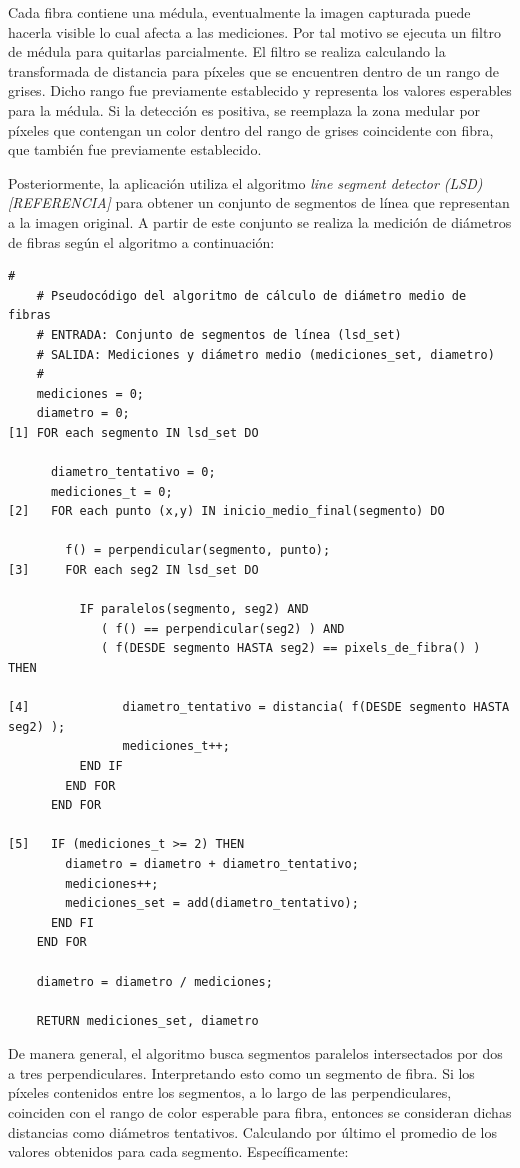 \documentclass[runningheads,a4paper]{llncs}
\begin{document}
Cada fibra contiene una médula, eventualmente la imagen capturada puede hacerla visible lo cual afecta a 
las mediciones. Por tal motivo se ejecuta un filtro de médula para quitarlas parcialmente. El filtro se realiza calculando la transformada de distancia para píxeles que se encuentren dentro de un rango de grises. 
Dicho rango fue previamente establecido y representa los valores esperables para la médula. Si la detección es positiva, se reemplaza la zona medular por píxeles que contengan un color dentro del rango de grises  
coincidente con fibra, que también fue previamente establecido.

Posteriormente, la aplicación utiliza el algoritmo {\it line segment detector (LSD) [REFERENCIA]} para obtener un conjunto de segmentos de línea que representan a la imagen original. A partir de este conjunto se 
realiza la medición de diámetros de fibras según el algoritmo a continuación:

\begin{Verbatim}[commandchars=\\\{\}]
    #
    # Pseudocódigo del algoritmo de cálculo de diámetro medio de fibras
    # ENTRADA: Conjunto de segmentos de línea (lsd_set)
    # SALIDA: Mediciones y diámetro medio (mediciones_set, diametro)
    #
    mediciones = 0;
    diametro = 0;
[1] FOR each segmento IN lsd_set DO

      diametro_tentativo = 0;
      mediciones_t = 0;
[2]   FOR each punto (x,y) IN inicio_medio_final(segmento) DO

        f() = perpendicular(segmento, punto);
[3]     FOR each seg2 IN lsd_set DO

          IF paralelos(segmento, seg2) AND 
             ( f() == perpendicular(seg2) ) AND
             ( f(DESDE segmento HASTA seg2) == pixels_de_fibra() ) THEN

[4]             diametro_tentativo = distancia( f(DESDE segmento HASTA seg2) );
                mediciones_t++;
          END IF
        END FOR
      END FOR

[5]   IF (mediciones_t >= 2) THEN 
        diametro = diametro + diametro_tentativo;
        mediciones++;
        mediciones_set = add(diametro_tentativo);
      END FI
    END FOR

    diametro = diametro / mediciones;

    RETURN mediciones_set, diametro
\end{Verbatim}

 
De manera general, el algoritmo busca segmentos paralelos intersectados por dos a tres perpendiculares.
Interpretando esto como un segmento de fibra. Si los píxeles contenidos entre los segmentos, a lo largo de
 las  perpendiculares, coinciden con el rango de color esperable para fibra, entonces se consideran dichas
distancias como diámetros tentativos. Calculando por último el promedio de los valores obtenidos para 
cada segmento. Específicamente:   
\end{document}

